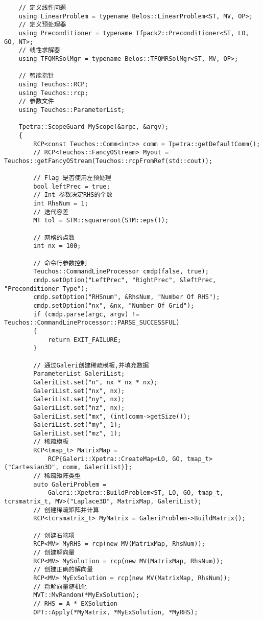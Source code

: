 \begin{lstlisting}
    // 定义线性问题
    using LinearProblem = typename Belos::LinearProblem<ST, MV, OP>;
    // 定义预处理器
    using Preconditioner = typename Ifpack2::Preconditioner<ST, LO, GO, NT>;
    // 线性求解器
    using TFQMRSolMgr = typename Belos::TFQMRSolMgr<ST, MV, OP>;

    // 智能指针
    using Teuchos::RCP;
    using Teuchos::rcp;
    // 参数文件
    using Teuchos::ParameterList;

    Tpetra::ScopeGuard MyScope(&argc, &argv);
    {
        RCP<const Teuchos::Comm<int>> comm = Tpetra::getDefaultComm();
        // RCP<Teuchos::FancyOStream> Myout = Teuchos::getFancyOStream(Teuchos::rcpFromRef(std::cout));

        // Flag 是否使用左预处理
        bool leftPrec = true;
        // Int 参数决定RHS的个数
        int RhsNum = 1;
        // 迭代容差
        MT tol = STM::squareroot(STM::eps());

        // 网格的点数
        int nx = 100;

        // 命令行参数控制
        Teuchos::CommandLineProcessor cmdp(false, true);
        cmdp.setOption("LeftPrec", "RightPrec", &leftPrec, "Preconditioner Type");
        cmdp.setOption("RHSnum", &RhsNum, "Number Of RHS");
        cmdp.setOption("nx", &nx, "Number Of Grid");
        if (cmdp.parse(argc, argv) != Teuchos::CommandLineProcessor::PARSE_SUCCESSFUL)
        {
            return EXIT_FAILURE;
        }

        // 通过Galeri创建稀疏模板,并填充数据
        ParameterList GaleriList;
        GaleriList.set("n", nx * nx * nx);
        GaleriList.set("nx", nx);
        GaleriList.set("ny", nx);
        GaleriList.set("nz", nx);
        GaleriList.set("mx", (int)comm->getSize());
        GaleriList.set("my", 1);
        GaleriList.set("mz", 1);
        // 稀疏模板
        RCP<tmap_t> MatrixMap =
            RCP{Galeri::Xpetra::CreateMap<LO, GO, tmap_t>("Cartesian3D", comm, GaleriList)};
        // 稀疏矩阵类型
        auto GaleriProblem =
            Galeri::Xpetra::BuildProblem<ST, LO, GO, tmap_t, tcrsmatrix_t, MV>("Laplace3D", MatrixMap, GaleriList);
        // 创建稀疏矩阵并计算
        RCP<tcrsmatrix_t> MyMatrix = GaleriProblem->BuildMatrix();

        // 创建右端项
        RCP<MV> MyRHS = rcp(new MV(MatrixMap, RhsNum));
        // 创建解向量
        RCP<MV> MySolution = rcp(new MV(MatrixMap, RhsNum));
        // 创建正确的解向量
        RCP<MV> MyExSolution = rcp(new MV(MatrixMap, RhsNum));
        // 将解向量随机化
        MVT::MvRandom(*MyExSolution);
        // RHS = A * EXSolution
        OPT::Apply(*MyMatrix, *MyExSolution, *MyRHS);


\end{lstlisting}
